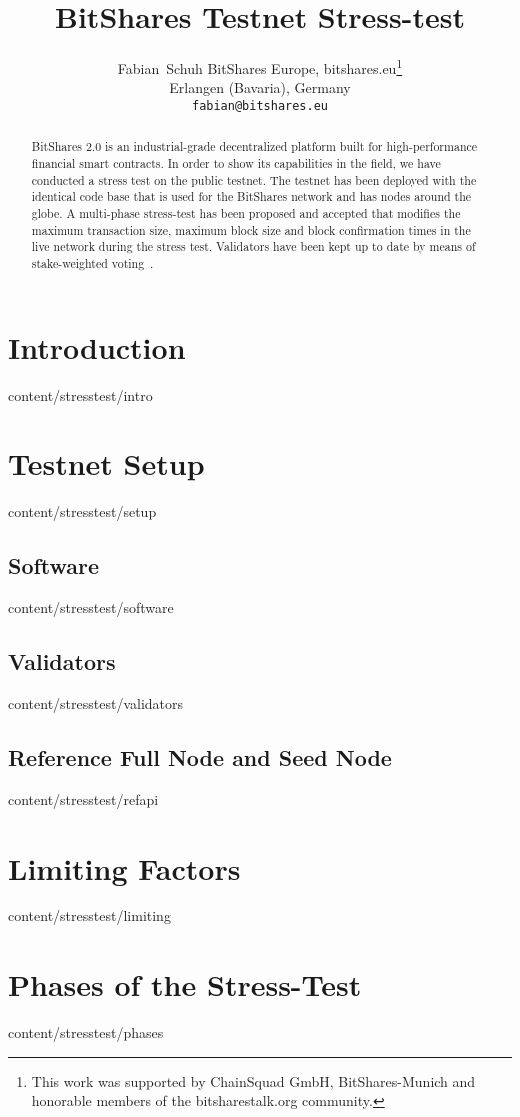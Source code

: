 \documentclass{btswhitepaper}
\title{BitShares Testnet Stress-test}
\author{
 Fabian~Schuh
 BitShares Europe, bitshares.eu\thanks{This work was supported by ChainSquad GmbH, BitShares-Munich and honorable members of the bitsharestalk.org community.}\\
 Erlangen (Bavaria), Germany\\
 \texttt{fabian@bitshares.eu}
}
\begin{document}
\maketitle

\begin{abstract}%
 BitShares 2.0 is an industrial-grade decentralized platform built for
 high-performance financial smart contracts. In order to show its capabilities
 in the field, we have conducted a stress test on the public testnet. The
 testnet has been deployed with the identical code base that is used for
 the BitShares network and has nodes around the globe. A multi-phase
 stress-test has been proposed and accepted that modifies the maximum
 transaction size, maximum block size and block confirmation times in the live
 network during the stress test. Validators have been kept up to date by means
 of stake-weighted voting~\cite{bts:general}.
\end{abstract}

\section    { Introduction                       }  { content/stresstest/intro              } 
\section    { Testnet Setup                      }  { content/stresstest/setup              } 
\subsection { Software                           }  { content/stresstest/software           } 
\subsection { Validators                         }  { content/stresstest/validators         } 
\subsection { Reference Full Node and Seed Node  }  { content/stresstest/refapi             } 
\section    { Limiting Factors                   }  { content/stresstest/limiting           }
\section    { Phases of the Stress-Test          }  { content/stresstest/phases             } 
\end{document}
